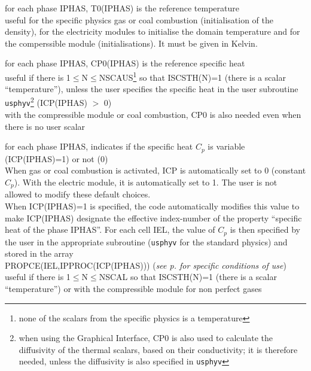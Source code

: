 {for each phase IPHAS, T0(IPHAS) is the reference temperature \\ 
useful for the specific physics gas or coal combustion (initialisation
of the density), for the electricity modules to initialise the domain
temperature and for the comperssible module (initialisations). It must be given
in Kelvin.}

{for each phase IPHAS, CP0(IPHAS) is the reference specific heat\\
useful if there is 1$\leqslant$N$\leqslant$NSCAUS\footnote{none of the scalars
from the specific physics is a temperature} so that ISCSTH(N)=1
(there is a scalar ``temperature''), unless the user specifies the
specific heat in the user subroutine \texttt{usphyv}\footnote{when using the
Graphical Interface, CP0 is also used to calculate the diffusivity of the
thermal scalars, based on their conductivity; it is therefore needed, unless the
diffusivity is also specified in \texttt{usphyv}} (ICP(IPHAS) $>$ 0)\\
with the compressible module or coal combustion, CP0 is also needed even when
there is no user scalar}

{for each phase IPHAS, indicates if the specific heat $C_p$ is variable
(ICP(IPHAS)=1) or not (0)\\
When gas or coal combustion is activated, ICP is automatically set to 0
(constant $C_p$). With the electric module, it is automatically set to 1.
The user is not allowed to modify these default choices.\\
When ICP(IPHAS)=1 is specified, the code automatically modifies this value to
make ICP(IPHAS) designate the effective index-number of the property
``specific heat of the phase IPHAS''. For each cell IEL, the value of
$C_p$ is then specified by the user in the appropriate subroutine
(\texttt{usphyv} for the standard physics) and stored in the array\\
PROPCE(IEL,IPPROC(ICP(IPHAS)))  
({\em see p.\pageref{prg_propvar} for specific conditions of use})\\
useful if there is 1$\leqslant$N$\leqslant$NSCAL so that ISCSTH(N)=1
(there is a scalar ``temperature'') or with the compressible module for non
perfect gases}

